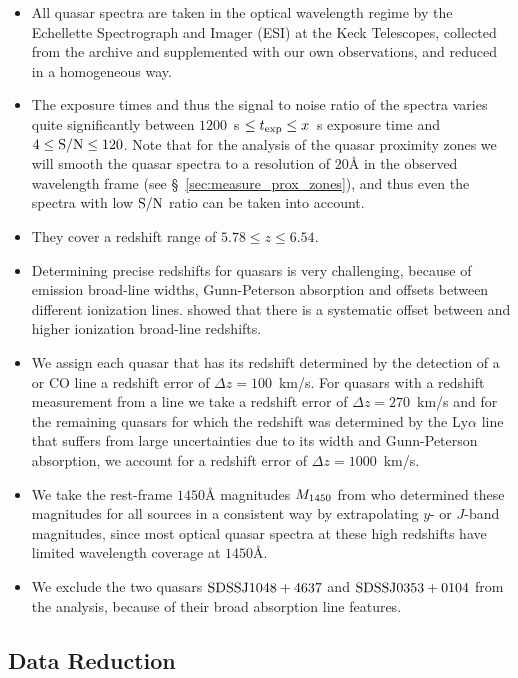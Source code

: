 \documentclass[iop]{emulateapj}
\newcommand{\lya} {Ly$\alpha$\xspace}
\newcommand{\cii} {\ion{C}{2}\xspace}
\newcommand{\mgii} {\ion{Mg}{2}\xspace}
\begin{document}
\begin{itemize}
\item All quasar spectra are taken in the optical wavelength regime by the Echellette Spectrograph and Imager (ESI) at the Keck Telescopes, collected from the archive and supplemented with our own observations, and reduced in a homogeneous way. 
\item The exposure times and thus the signal to noise ratio of the spectra varies quite significantly between $1200$~s $\leq t_{\rm exp}\leq x$~s exposure time and $4\leq \rm S/N \leq 120$. Note that for the analysis of the quasar proximity zones we will smooth the quasar spectra to a resolution of $20${\AA} in the observed wavelength frame (see \S~\ref{sec:measure_prox_zones}), and thus even the spectra with low $\rm S/N$ ratio can be taken into account. 
\item They cover a redshift range of $5.78\leq z \leq 6.54$. 
\item Determining precise redshifts for quasars is very challenging, because of emission broad-line widths, Gunn-Peterson absorption and offsets between different ionization lines. \citet{Venemans2016} showed that there is a systematic offset between \mgii and higher ionization broad-line redshifts. 
\item We assign each quasar that has its redshift determined by the detection of a \cii or CO line a redshift error of $\Delta z=100$~km/s. For quasars with a redshift measurement from a \mgii line we take a redshift error of $\Delta z=270$~km/s and for the remaining quasars for which the redshift was determined by the \lya line that suffers from large uncertainties due to its width and Gunn-Peterson absorption, we account for a redshift error of $\Delta z=1000$~km/s. 
\item We take the rest-frame $1450${\AA} magnitudes $M_{\rm 1450}$ from \citet{Banados2016} who determined these magnitudes for all sources in a consistent way by extrapolating $y$- or $J$-band magnitudes, since most optical quasar spectra at these high redshifts have limited wavelength coverage at $1450${\AA}. 
\item We exclude the two quasars $\rm SDSS J1048+4637$ and $\rm SDSS J0353+0104$ from the analysis, because of their broad absorption line features. 
\end{itemize}

\subsection{Data Reduction}
\end{document}
